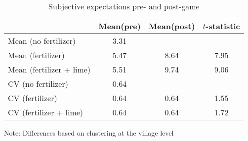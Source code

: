 \begin{table}[htbp]
\centering
\hspace*{-1.2cm}
\begin{threeparttable}
\caption{Subjective expectations pre- and post-game}
\label{tab:subj ttest}
\begin{tabular}{l ccc}
\hline
\hline
            &   Mean(pre)&  Mean(post)&$t$-statistic\\
\hline
Mean (no fertilizer)&        3.31&            &            \\
%
%
%
Mean (fertilizer)&        5.47&        8.64&        7.95\\
%
%
%
Mean (fertilizer + lime)&        5.51&        9.74&        9.06\\
%
%
%
CV (no fertilizer)&        0.64&            &            \\
%
%
%
CV (fertilizer)&        0.64&        0.64&        1.55\\
%
%
%
CV (fertilizer + lime)&        0.64&        0.64&        1.72\\
\hline
\hline
\end{tabular}
\begin{tablenotes}
\footnotesize
\item{Note: Differences based on clustering at the village level}
\end{tablenotes}
\end{threeparttable}
\end{table}
